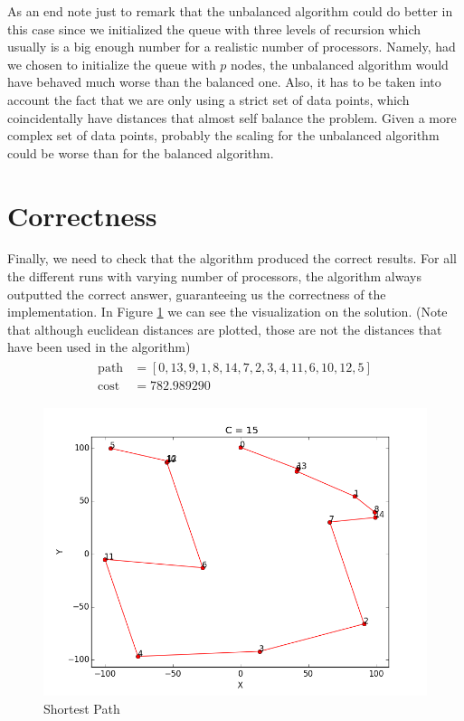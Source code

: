 \documentclass[a4paper]{article}
\begin{document}
    As an end note just to remark that the unbalanced algorithm could do better in this case since we initialized the queue with three levels of recursion which usually is a big enough number for a realistic number of processors. Namely, had we chosen to initialize the queue with $p$ nodes, the unbalanced algorithm would have behaved much worse than the balanced one. Also, it has to be taken into account the fact that we are only using a strict set of data points, which coincidentally have distances that almost self balance the problem. Given a more complex set of data points, probably the scaling for the unbalanced algorithm could be worse than for the balanced algorithm.

\newpage
\section{Correctness}

    Finally, we need to check that the algorithm produced the correct results. For all the different runs with varying number of processors, the algorithm always outputted the correct answer, guaranteeing us the correctness of the implementation. In Figure \ref{fig:best} we can see the visualization on the solution. (Note that although euclidean distances are plotted, those are not the distances that have been used in the algorithm)
    \begin{align}
    \begin{split}
      \text{path} &= [0, 13, 9, 1, 8, 14, 7, 2, 3, 4, 11, 6, 10, 12, 5]\\
      \text{cost} &= 782.989290
    \end{split}
    \end{align}

    \begin{figure}[htp!]
      \centering
        \includegraphics[width=.79\textwidth]{../2 Analysis/C15.png}
        \caption{Shortest Path}
        \label{fig:best}
    \end{figure}
\end{document}

